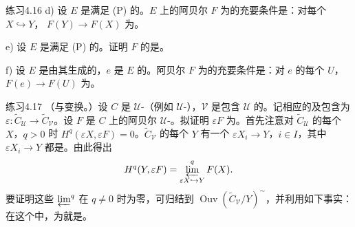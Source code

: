 \begin{SGAresult}{练习}{4.16}
d) 设 $E$ 是满足 (P) 的。$E$ 上的阿贝尔 $F$ 为的充要条件是：对每个 $X\hookrightarrow Y$， $F(Y)\to F(X)$ 为。

e) 设 $E$ 是满足 (P) 的。证明 $F$ 的是。

f) 设 $E$ 是由其生成的，$e$ 是 $E$ 的。阿贝尔 $F$ 为的充要条件是：对 $e$ 的每个 $U$， $F(e)\to F(U)$ 为。
\end{SGAresult}
\begin{SGAresult}{练习}{4.17}
（与变换。）设 $C$ 是 $\mathcal U$-（例如 $\mathcal U$-），$\mathcal V$ 是包含 $\mathcal U$ 的。记相应的及包含为 $\varepsilon:\widetilde C_{\mathcal U}\to\widetilde C_{\mathcal V}$。设 $F$ 是 $C$ 上的阿贝尔 $\mathcal U$-。拟证明 $\varepsilon F$ 为。首先注意对 $\widetilde C_{\mathcal U}$ 的每个 $X$，$q>0$ 时 $H^q(\varepsilon X,\varepsilon F)=0$。$\widetilde C_{\mathcal V}$ 的每个 $Y$ 有一个 $\varepsilon X_i\to Y$，$i\in I$，其中 $\varepsilon X_i\to Y$ 都是。由此得出
\[
 H^q(Y,\varepsilon F)=\varprojlim_{\varepsilon X\hookrightarrow Y}^{q}F(X).
\]
要证明这些 $\varprojlim^{q}$ 在 $q\ne0$ 时为零，可归结到 $\operatorname{Ouv}(\widetilde C_{\mathcal V}/Y)^\sim$，并利用如下事实：在这个中，为就是。
\end{SGAresult}
